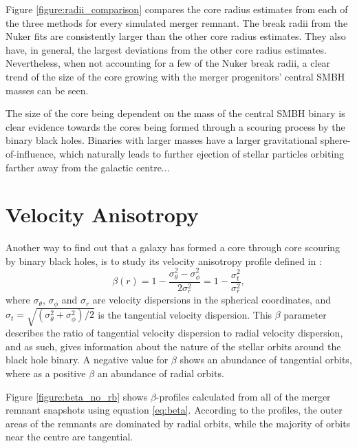 \documentclass[english, oneside]{HYgradu}
\begin{document}
Figure \ref{figure:radii_comparison} compares the core radius estimates from each of the three methods for every simulated merger remnant. The break radii from the Nuker fits are consistently larger than the other core radius estimates. They also have, in general, the largest deviations from the other core radius estimates. Nevertheless, when not accounting for a few of the Nuker break radii, a clear trend of the size of the core growing with the merger progenitors' central SMBH masses can be seen.

The size of the core being dependent on the mass of the central SMBH binary is clear evidence towards the cores being formed through a scouring process by the binary black holes. Binaries with larger masses have a larger gravitational sphere-of-influence, which naturally leads to further ejection of stellar particles orbiting farther away from the galactic centre...



\section{Velocity Anisotropy}


Another way to find out that a galaxy has formed a core through core scouring by binary black holes, is to study its velocity anisotropy profile defined in \cite{BinneyTremaine}:
\begin{equation}
\beta(r) = 1 - \frac{\sigma_\theta^2 - \sigma_\phi^2}{2\sigma_r^2} = 1 - \frac{\sigma_t^2}{\sigma_r^2}, \label{eq:beta}
\end{equation}
where $\sigma_\theta$, $\sigma_\phi$ and $\sigma_r$ are velocity dispersions in the spherical coordinates, and $\sigma_t = \sqrt{(\sigma_\theta^2 + \sigma_\phi^2) / 2}$ is the tangential velocity dispersion. This $\beta$ parameter describes the ratio of tangential velocity dispersion to radial velocity dispersion, and as such, gives information about the nature of the stellar orbits around the black hole binary. A negative value for $\beta$ shows an abundance of tangential orbits, where as a positive $\beta$ an abundance of radial orbits. 

Figure \ref{figure:beta_no_rb} shows $\beta$-profiles calculated from all of the merger remnant snapshots using equation \ref{eq:beta}. According to the profiles, the outer areas of the remnants are dominated by radial orbits, while the majority of orbits near the centre are tangential.
\end{document}
